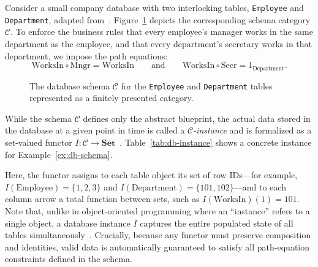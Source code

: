 \begin{example}
\label{ex:db-schema}
Consider a small company database with two interlocking tables, \texttt{Employee} and \texttt{Department}, adapted from~\cite[Sec.~3.1]{FongSpivak19}. Figure~\ref{fig:db-schema} depicts the corresponding schema category $\mathcal{C}$. To enforce the business rules that every employee's manager works in the same department as the employee, and that every department's secretary works in that department, we impose the path equations:
\[
  \mathrm{WorksIn} \circ \mathrm{Mngr} = \mathrm{WorksIn}
  \qquad\text{and}\qquad
  \mathrm{WorksIn} \circ \mathrm{Secr} = 1_{\mathrm{Department}}.
\]
\end{example}

\begin{figure}[tb]
  \centering
  \caption{The database schema $\mathcal{C}$ for the \texttt{Employee} and \texttt{Department} tables represented as a finitely presented category.}
  \label{fig:db-schema}
\end{figure}

While the schema $\mathcal{C}$ defines only the abstract blueprint, the actual data stored in the database at a given point in time is called a \emph{$\mathcal{C}$-instance} and is formalized as a set-valued functor $I \colon \mathcal{C} \to \mathbf{Set}$~\cite[Def.~3.37]{FongSpivak19}. Table~\ref{tab:db-instance} shows a concrete instance for Example~\ref{ex:db-schema}.

Here, the functor assigns to each table object its set of row IDs---for example, $I(\mathrm{Employee}) = \{1, 2, 3\}$ and $I(\mathrm{Department}) = \{101, 102\}$---and to each column arrow a total function between sets, such as $I(\mathrm{WorksIn})(1) = 101$. Note that, unlike in object-oriented programming where an ``instance'' refers to a single object, a database instance $I$ captures the entire populated state of all tables simultaneously~\cite[Sec.~3.3.3]{FongSpivak19}. Crucially, because any functor must preserve composition and identities, valid data is automatically guaranteed to satisfy all path-equation constraints defined in the schema.

